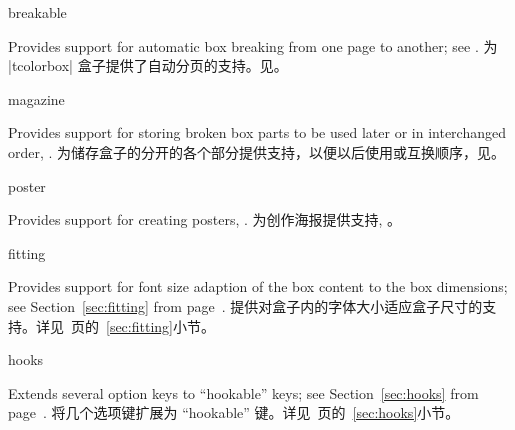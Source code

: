\begin{docTcbKey}[library]{breakable}{}{}
\begin{stripedbox}
Provides support for automatic box breaking from one page to another;
see .
\tcblower
为 |tcolorbox| 盒子提供了自动分页的支持。见。

\end{stripedbox}



\begin{docTcbKey}[library]{magazine}{}{}
\begin{stripedbox}
Provides support for storing broken box parts to be used later or
in interchanged order, .
\tcblower
为储存盒子的分开的各个部分提供支持，以便以后使用或互换顺序，见。
\end{stripedbox}
\end{docTcbKey}

\begin{docTcbKey}[library]{poster}{}{}
\begin{stripedbox}
Provides support for creating posters, .
\tcblower
为创作海报提供支持, 。
\end{stripedbox}
\end{docTcbKey}

\begin{docTcbKey}[library]{fitting}{}{}
\begin{stripedbox}
Provides support for font size adaption of the box content to
the box dimensions;
see Section~\ref{sec:fitting} from page~\pageref{sec:fitting}.
\tcblower
提供对盒子内的字体大小适应盒子尺寸的支持。详见~\pageref{sec:fitting}页的~\ref{sec:fitting}小节。
\end{stripedbox}
\end{docTcbKey}

\begin{docTcbKey}[library]{hooks}{}{}
\begin{stripedbox}
Extends several option keys to \enquote{hookable} keys;
see Section~\ref{sec:hooks} from page~\pageref{sec:hooks}.
\tcblower
将几个选项键扩展为 \enquote{hookable} 键。详见~\pageref{sec:hooks}页的~\ref{sec:hooks}小节。
\end{stripedbox}
\end{docTcbKey}


\end{docTcbKey}
